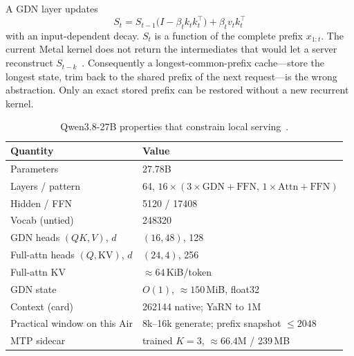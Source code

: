 \documentclass[11pt]{article}
\theoremstyle{definition}
\begin{document}
A GDN layer updates
\begin{equation}
S_t = S_{t-1}\bigl(I - \beta_t k_t k_t^\top\bigr) + \beta_t v_t k_t^\top
\label{eq:gdn}
\end{equation}
with an input-dependent decay. $S_t$ is a function of the complete prefix $x_{1:t}$. The current Metal kernel does not return the intermediates that would let a server reconstruct $S_{t-k}$~\citep{vllm36649}. Consequently a longest-common-prefix cache---store the longest state, trim back to the shared prefix of the next request---is the wrong abstraction. Only an exact stored prefix can be restored without a new recurrent kernel.

\begin{table}[t]
\centering
\caption{Qwen3.8-27B properties that constrain local serving~\citep{qwen38card,yarn2024}.}
\label{tab:qwen38}
\small
\begin{tabular}{@{}ll@{}}
\toprule
Quantity & Value \\
\midrule
Parameters & 27.78B \\
Layers / pattern & 64, $16{\times}(3{\times}\mathrm{GDN{+}FFN},\,1{\times}\mathrm{Attn{+}FFN})$ \\
Hidden / FFN & 5120 / 17408 \\
Vocab (untied) & 248320 \\
GDN heads $(QK,V)$, $d$ & $(16,48)$, 128 \\
Full-attn heads $(Q,\mathrm{KV})$, $d$ & $(24,4)$, 256 \\
Full-attn KV & ${\approx}64$\,KiB/token \\
GDN state & $O(1)$, ${\approx}150$\,MiB, float32 \\
Context (card) & 262144 native; YaRN to 1M~\citep{yarn2024} \\
Practical window on this Air & 8k--16k generate; prefix snapshot $\le 2048$ \\
MTP sidecar & trained $K{=}3$, ${\approx}66.4$M / 239\,MB \\
\bottomrule
\end{tabular}
\end{table}
\end{document}
